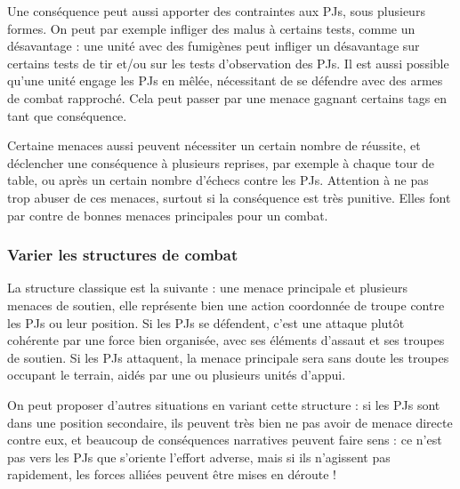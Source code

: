 \documentclass{report}
\begin{document}
\begin{multicols}{2}
Une conséquence peut aussi apporter des contraintes aux PJs, sous plusieurs formes. On peut par exemple infliger des malus à certains tests, comme un désavantage : une unité avec des fumigènes peut infliger un désavantage sur certains tests de tir et/ou sur les tests d'observation des PJs. Il est aussi possible qu'une unité engage les PJs en mêlée, nécessitant de se défendre avec des armes de combat rapproché. Cela peut passer par une menace gagnant certains tags en tant que conséquence.

Certaine menaces aussi peuvent nécessiter un certain nombre de réussite, et déclencher une conséquence à plusieurs reprises, par exemple à chaque tour de table, ou après un certain nombre d'échecs contre les PJs. Attention à ne pas trop abuser de ces menaces, surtout si la conséquence est très punitive. Elles font par contre de bonnes menaces principales pour un combat.

\subsubsection{Varier les structures de combat}
La structure classique est la suivante : une menace principale et plusieurs menaces de soutien, elle représente bien une action coordonnée de troupe contre les PJs ou leur position. Si les PJs se défendent, c'est une attaque plutôt cohérente par une force bien organisée, avec ses éléments d'assaut et ses troupes de soutien. Si les PJs attaquent, la menace principale sera sans doute les troupes occupant le terrain, aidés par une ou plusieurs unités d'appui.

On peut proposer d'autres situations en variant cette structure : si les PJs sont dans une position secondaire, ils peuvent très bien ne pas avoir de menace directe contre eux, et beaucoup de conséquences narratives peuvent faire sens : ce n'est pas vers les PJs que s'oriente l'effort adverse, mais si ils n'agissent pas rapidement, les forces alliées peuvent être mises en déroute !

\end{multicols}
\end{document}
